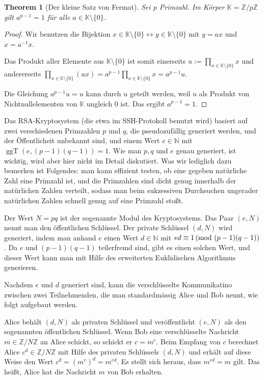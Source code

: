 \documentclass[
a4paper,landscape,16pt,
bibliography=totocnumbered,
numbers=noenddot,
]{scrartcl}
\numberwithin{equation}{subsection}
\newcommand{\N}{\mathbb N}
\newcommand{\Z}{\mathbb Z}
\newcommand{\K}{\mathbb K}
\newcommand{\ggT}{\operatorname{ggT}} %
\theoremstyle{plain}
\newtheorem*{thm}{Theorem}
\theoremstyle{definition}
\begin{document}
\begin{thm}[Der kleine Satz von Fermat] 
	Sei $p$ Primzahl. Im Körper $\K = \Z / p\Z$ gilt $a^{p-1} = 1$ für alle $a \in \K \setminus \{0\}$. 
\end{thm} 
\begin{proof}
Wir benutzen die Bijektion $x  \in \K \setminus \{0\}\leftrightarrow y \in \K \setminus \{0\}$ mit $y= ax$ und $x =a^{-1} x$. 
	
	
	Das Produkt aller Elemente aus $\K \setminus \{0\}$ ist somit einerseits $u:=\prod_{x \in \K \setminus \{0\} } x$ und andererseits $\prod_{x \in \K \setminus \{0\}} (a x) = a^{p-1} \prod_{x \in \K \setminus \{0\}} x = a^{p-1} u$.
	
	Die Gleichung $a^{p-1} u = u$ kann durch $u$ geteilt werden, weil $u$ als Produkt von Nichtnullelementen von $\K$ ungleich $0$ ist. Das ergibt $a^{p-1} = 1$.
\end{proof} 

	Das RSA-Kryptosystem (die etwa im SSH-Protokoll benutzt wird) basiert auf zwei verschiedenen Primzahlen $p$ und $q$, die pseudozufällig generiert werden, und der Öffentlicheit unbekannt sind, und einem Wert $e \in \N$ mit $\ggT(e,(p-1)(q-1))= 1$. Wie man $p, q$ und $e$ genau generiert, ist wichtig, wird aber hier nicht im Detail diskutiert.  Was wir lediglich dazu bemerken ist Folgendes: man kann effizient testen, ob eine gegeben natürliche Zahl eine Primzahl ist, und die Primzahlen sind dicht genug innerhalb der natürlichen Zahlen verteilt, sodass man beim sukzessiven Durchsuchen ungerader natürlichen Zahlen schnell genug auf eine Primzahl stoßt. 
	
	Der Wert $N = pq$ ist der sogenannte Modul des Kryptosystems. Das Paar $(e,N)$ nennt man den öffentlichen Schlüssel. Der private Schlüssel $(d,N)$ wird generiert, indem man anhand $e$ einen Wert $d \in \N$ mit $e d \equiv 1 \,(\mathrm{mod} \ (p-1)(q-1))$. Da $e$ und $(p-1)(q-1)$ teilerfremd sind, gibt es einen solchen Wert, und dieser Wert kann man mit Hilfe des erweiterten Euklidischen Algorithmus generieren. 
	
	Nachdem $e$ und $d$ generiert sind, kann die verschlüsselte Kommunikatino zwischen zwei Teilnehmenden, die man standardmässig Alice und Bob nennt, wie folgt aufgebaut werden. 
	
	Alice behält $(d,N)$ als privaten Schlüssel und veröffentlicht $(e,N)$ als den sogenannten öffentlichen Schlüssel. Wenn Bob eine  verschlüsselte Nachricht $m \in  \Z / N \Z$ an Alice schickt, so schickt er $c=m^e$.  Beim Empfang von $c$ berechnet Alice $c^d \in \Z / N \Z$ mit Hilfe des privaten Schlüssels $(d,N)$ und erhält auf diese Weise den Wert $c^d = (m^e)^d = m^{ed}$. Es stellt sich heraus, dass $m^{ed} = m$ gilt. Das heißt, Alice hat die Nachricht $m$ von Bob erhalten. 
	
\end{document}
